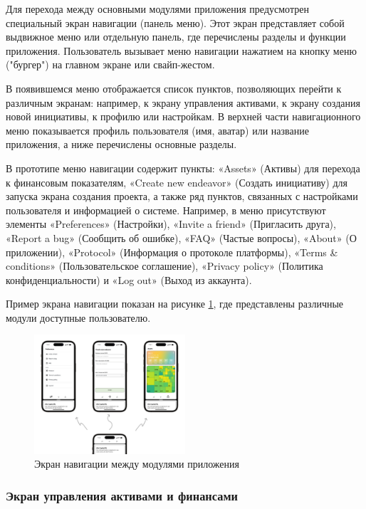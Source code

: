 \documentclass[
    candidate, %
    subf, %
    dotsinheaders=false,
]{disser}
\begin{document}
Для перехода между основными модулями приложения предусмотрен специальный экран навигации (панель меню). Этот экран представляет собой выдвижное меню или отдельную панель, где перечислены разделы и функции приложения. Пользователь вызывает меню навигации нажатием на кнопку меню ("бургер") на главном экране или свайп-жестом.

В появившемся меню отображается список пунктов, позволяющих перейти к различным экранам: например, к экрану управления активами, к экрану создания новой инициативы, к профилю или настройкам. В верхней части навигационного меню показывается профиль пользователя (имя, аватар) или название приложения, а ниже перечислены основные разделы.

В прототипе меню навигации содержит пункты: «Assets» (Активы) для перехода к финансовым показателям, «Create new endeavor» (Создать инициативу) для запуска экрана создания проекта, а также ряд пунктов, связанных с настройками пользователя и информацией о системе. Например, в меню присутствуют элементы «Preferences» (Настройки), «Invite a friend» (Пригласить друга), «Report a bug» (Сообщить об ошибке), «FAQ» (Частые вопросы), «About» (О приложении), «Protocol» (Информация о протоколе платформы), «Terms \& conditions» (Пользовательское соглашение), «Privacy policy» (Политика конфиденциальности) и «Log out» (Выход из аккаунта).

Пример экрана навигации показан на рисунке \ref{fig:app-navigation}, где представлены различные модули доступные пользователю.

\begin{figure}[h]
  \centering
  \includegraphics[width=0.5\textwidth]{./assets/app-navigation.png}
  \caption{Экран навигации между модулями приложения}
  \label{fig:app-navigation}
\end{figure}

\subsubsection{Экран управления активами и финансами}
\end{document}
